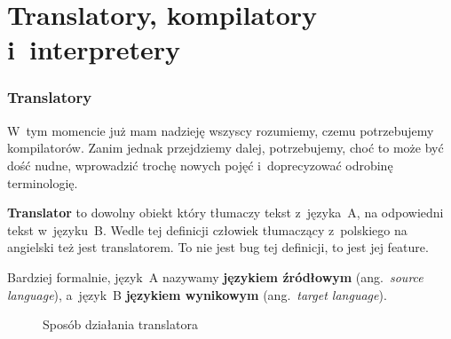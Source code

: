 \documentclass[10pt,t]{beamer}
\begin{document}










\section{Translatory, kompilatory i~interpretery}



\begin{frame}
  \frametitle{Translatory}


  W~tym momencie już mam nadzieję wszyscy rozumiemy, czemu potrzebujemy
  kompilatorów. Zanim jednak przejdziemy dalej, potrzebujemy, choć to może
  być dość nudne, wprowadzić trochę nowych pojęć i~doprecyzować odrobinę
  terminologię.

  \textbf{Translator} to dowolny obiekt który tłumaczy tekst z~języka~A,
  na odpowiedni tekst w~języku~B. Wedle tej definicji człowiek tłumaczący
  z~polskiego na angielski też jest translatorem. To nie jest bug tej
  definicji, to jest jej feature.

  Bardziej formalnie, język~A nazywamy \textbf{językiem źródłowym}
  (ang.~\textit{source language}), a~język~B \textbf{językiem wynikowym}
  (ang.~\textit{target language}).






  \begin{figure}

    \label{fig:Translator-01}



    \caption{Sposób działania translatora}


  \end{figure}

\end{frame}
\end{document}
